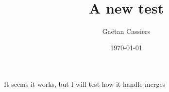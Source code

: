 \documentclass[english,frenchb, 10pt, oneside, headings=normal]{scrartcl}
\begin{document}
\titlehead{The try of the day}
\subject{}
\title{A new test}
\subtitle{}
\author{Gaëtan Cassiers}
\date{\today}
\publishers{}

\maketitle

It seems it works, but I will test how it handle merges
\end{document}
